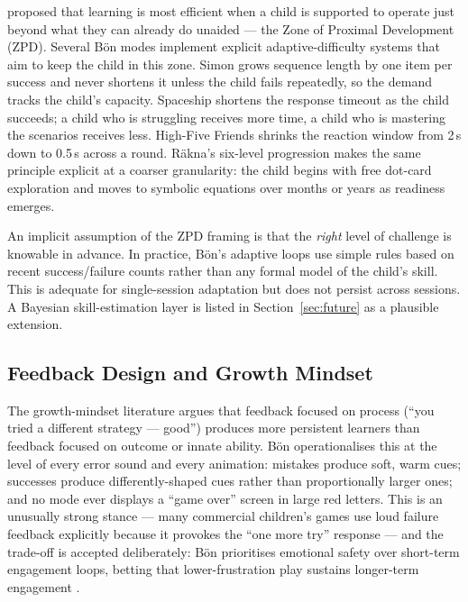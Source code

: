 \documentclass[12pt, a4paper]{article}
\newcommand{\Bodn}{B\"o\dh{}n}
\begin{document}
\citet{vygotsky1978mind} proposed that learning is most efficient when a child
is supported to operate just beyond what they can already do unaided --- the
Zone of Proximal Development (ZPD). Several \Bodn{} modes implement explicit
adaptive-difficulty systems that aim to keep the child in this zone. Simon
grows sequence length by one item per success and never shortens it unless the
child fails repeatedly, so the demand tracks the child's capacity. Spaceship
shortens the response timeout as the child succeeds; a child who is struggling
receives more time, a child who is mastering the scenarios receives less.
High-Five Friends shrinks the reaction window from 2\,s down to 0.5\,s across a
round. R\"akna's six-level progression makes the same principle explicit at a
coarser granularity: the child begins with free dot-card exploration and moves
to symbolic equations over months or years as readiness emerges.

An implicit assumption of the ZPD framing is that the \emph{right} level of
challenge is knowable in advance. In practice, \Bodn{}'s adaptive loops use
simple rules based on recent success/failure counts rather than any formal
model of the child's skill. This is adequate for single-session adaptation but
does not persist across sessions. A Bayesian skill-estimation layer is listed
in Section~\ref{sec:future} as a plausible extension.

\subsection{Feedback Design and Growth Mindset}

The growth-mindset literature \citep{dweck2006mindset} argues that feedback
focused on process (``you tried a different strategy --- good'') produces more
persistent learners than feedback focused on outcome or innate ability. \Bodn{}
operationalises this at the level of every error sound and every animation:
mistakes produce soft, warm cues; successes produce differently-shaped cues
rather than proportionally larger ones; and no mode ever displays a
``game over'' screen in large red letters. This is an unusually strong
stance --- many commercial children's games use loud failure feedback
explicitly because it provokes the ``one more try'' response --- and the
trade-off is accepted deliberately: \Bodn{} prioritises emotional safety over
short-term engagement loops, betting that lower-frustration play sustains
longer-term engagement \citep{diamond2016conclusions}.
\end{document}
